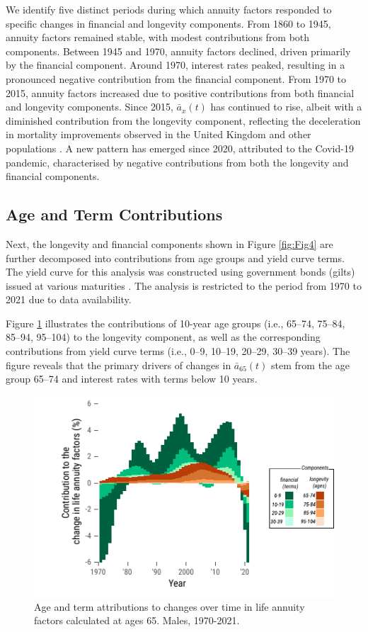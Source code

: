 \documentclass[12pt]{article}
\begin{document}
We identify five distinct periods during which annuity factors responded to specific changes in financial and longevity components. From 1860 to 1945, annuity factors remained stable, with modest contributions from both components. Between 1945 and 1970, annuity factors declined, driven primarily by the financial component. Around 1970, interest rates peaked, resulting in a pronounced negative contribution from the financial component. From 1970 to 2015, annuity factors increased due to positive contributions from both financial and longevity components. Since 2015, \( \bar{a}_x(t) \) has continued to rise, albeit with a diminished contribution from the longevity component, reflecting the deceleration in mortality improvements observed in the United Kingdom and other populations \citep{djeundje2022slowdown}. A new pattern has emerged since 2020, attributed to the Covid-19 pandemic, characterised by negative contributions from both the longevity and financial components.


\subsection{Age and Term Contributions}

Next, the longevity and financial components shown in Figure \ref{fig:Fig4} are further decomposed into contributions from age groups and yield curve terms. The yield curve for this analysis was constructed using government bonds (gilts) issued at various maturities \citep{BankOfEngland2024}. The analysis is restricted to the period from 1970 to 2021 due to data availability.

Figure \ref{fig:Fig5} illustrates the contributions of 10-year age groups (i.e., 65–74, 75–84, 85–94, 95–104) to the longevity component, as well as the corresponding contributions from yield curve terms (i.e., 0–9, 10–19, 20–29, 30–39 years). The figure reveals that the primary drivers of changes in \( \bar{a}_{65}(t) \) stem from the age group 65–74 and interest rates with terms below 10 years.

\begin{figure}[H]
	\centering
	\includegraphics[width=0.6\linewidth]{Fig/ageTermStructureDescomposition}
	\caption{{Age and term attributions to changes over time in life annuity factors calculated at ages 65. Males, 1970-2021.}}
	\label{fig:Fig5}
\end{figure}
\end{document}
